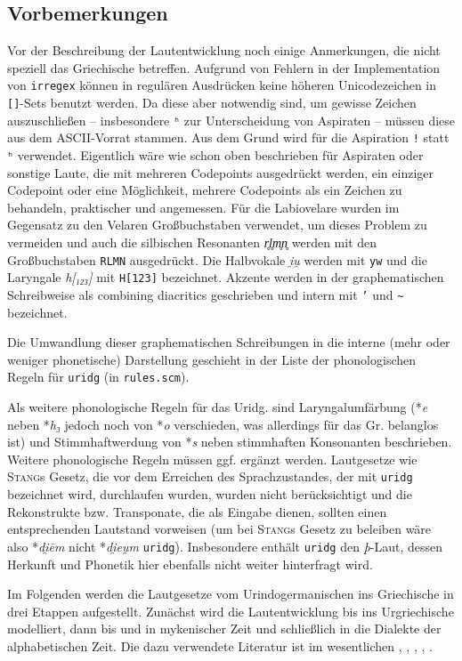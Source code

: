 \documentclass[12pt,a4paper,normalheadings]{scrartcl}
\def\rek#1{*\textit{#1}}
\def\bel#1{\textit{#1}}
\def\tt#1{\texttt{#1}}
\begin{document}
\subsection{Vorbemerkungen}
Vor der Beschreibung der Lautentwicklung noch einige Anmerkungen,
die nicht speziell das Griechische betreffen.
Aufgrund von Fehlern in der Implementation von \tt{irregex}
können in regulären Ausdrücken keine höheren Unicodezeichen
in \tt{[]}-Sets benutzt werden.
Da diese aber notwendig sind, um gewisse Zeichen auszuschließen
-- insbesondere \tt{ʰ} zur Unterscheidung von Aspiraten --
müssen diese aus dem ASCII-Vorrat stammen.
Aus dem Grund wird für die Aspiration \tt{!} statt \tt{ʰ} verwendet.
Eigentlich wäre wie schon oben beschrieben für Aspiraten oder sonstige Laute,
die mit mehreren Codepoints ausgedrückt werden,
ein einziger Codepoint
oder eine Möglichkeit, mehrere Codepoints als ein Zeichen zu behandeln,
praktischer und angemessen.
Für die Labiovelare wurden im Gegensatz zu den Velaren Großbuchstaben verwendet,
um dieses Problem zu vermeiden und auch
die silbischen Resonanten \bel{r̥l̥m̥n̥} werden mit den Großbuchstaben \tt{RLMN} ausgedrückt.
Die Halbvokale \bel{i̯u̯} werden mit \tt{yw} und
die Laryngale \bel{h[₁₂₃]} mit \tt{H[123]} bezeichnet.
Akzente werden in der graphematischen Schreibweise
als combining diacritics geschrieben und intern mit \tt{'} und \tt{\textasciitilde}
bezeichnet.

Die Umwandlung dieser graphematischen Schreibungen in die interne
(mehr oder weniger phonetische) Darstellung geschieht in der Liste der
phonologischen Regeln für \tt{uridg} (in \tt{rules.scm}).

Als weitere phonologische Regeln für das Uridg.
sind Laryngalumfärbung (\rek{e} neben \rek{h₃} jedoch noch von \rek{o}
verschieden, was allerdings für das Gr. belanglos ist)
und Stimmhaftwerdung von \rek{s} neben stimmhaften Konsonanten beschrieben.
Weitere phonologische Regeln müssen ggf. ergänzt werden.
Lautgesetze wie \textsc{Stang}s Gesetz,
die vor dem Erreichen des Sprachzustandes, der mit \tt{uridg} bezeichnet wird,
durchlaufen wurden,
wurden nicht berücksichtigt und die Rekonstrukte bzw. Transponate,
die als Eingabe dienen, sollten einen entsprechenden Lautstand vorweisen
(um bei \textsc{Stang}s Gesetz zu beleiben wäre also \rek{di̯ēm} nicht \rek{di̯eu̯m} \tt{uridg}).
Insbesondere enthält \tt{uridg} den \textit{þ}-Laut,
dessen Herkunft und Phonetik hier ebenfalls nicht weiter hinterfragt wird.

Im Folgenden werden die Lautgesetze vom Urindogermanischen ins Griechische
in drei Etappen aufgestellt.
Zunächst wird die Lautentwicklung bis ins Urgriechische modelliert,
dann bis und in mykenischer Zeit und schließlich in die Dialekte
der alphabetischen Zeit.
Die dazu verwendete Literatur ist im wesentlichen \cite{rix},
\cite{bart_frueh},
\cite{bart_hand},
\cite{sihler},
\cite{buck}.
\end{document}
